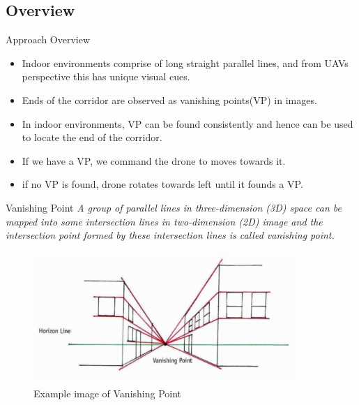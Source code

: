 \documentclass[8pt]{beamer}
\begin{document}
\subsection{Overview}
\begin{frame}{Approach Overview}
\bigskip
  \begin{itemize}
    \setlength\itemsep{1em}
    \item Indoor environments comprise of long straight parallel lines, and from UAV\’s perspective this has unique visual cues. 
    \item Ends of the corridor are observed as vanishing points(VP) in images.
    \item In indoor environments, VP can be found consistently and hence can be used to locate the end of the corridor.
    \item If we have a VP, we command the drone to moves towards it. 
    \item if no VP is found, drone rotates towards left until it founds a VP.
  \end{itemize}

\end{frame}

\begin{frame}{Vanishing Point}
\bigskip
\textit{A group of parallel lines in three-dimension (3D) space can be mapped into some intersection
lines in two-dimension (2D) image and the intersection point formed by these intersection lines
is called vanishing point.}
\vspace{0.5cm}
\begin{figure}[h]
  \includegraphics[width=10cm, height=5cm]{images/vanishing_point.jpg}%
  \caption{Example image of Vanishing Point}
\end{figure}

\end{frame}
\end{document}
